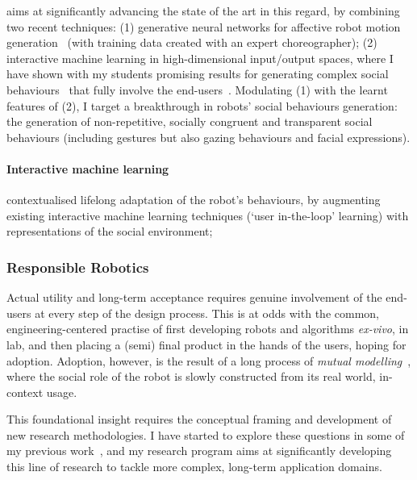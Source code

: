 \project aims at significantly advancing the state of the art in this regard, by
combining two recent techniques: (1) generative neural networks for affective
robot motion generation~\cite{marmpena2019generating,suguitan2020moveae} (with
training data created with an expert choreographer); (2) interactive machine
learning in high-dimensional input/output spaces, where I have shown with my
students promising results for generating complex social
behaviours~\cite{senft2019teaching, winkle2020couch} that fully involve the
end-users~\cite{winkle2018social}. Modulating (1) with the learnt features of
(2), I target a breakthrough in robots' social behaviours generation: the
generation of non-repetitive, socially congruent and transparent social
behaviours (including gestures but also gazing behaviours and facial
expressions).


\paragraph{Interactive machine learning}

contextualised lifelong adaptation of the robot's
behaviours, by augmenting existing interactive machine
learning techniques (`user in-the-loop' learning) with
representations of the social environment;


\subsubsection{Responsible Robotics}

Actual utility and long-term acceptance requires genuine involvement of the
end-users at every step of the design process. This is at odds with the common,
engineering-centered practise of first developing robots and algorithms \emph{ex-vivo}, in
lab, and then placing a (semi) final product in the hands of the users, hoping
for adoption. Adoption, however, is the result of a long process of \emph{mutual
modelling}~\autocite{sabanovic2010robots}, where
the social role of the robot is slowly constructed from its real world, in-context
usage.

This foundational insight requires the conceptual framing and development of new
research methodologies.  I have started to explore these questions in some of my
previous work~\autocite{senft2016sparc,winkle2019effective,winkle2021leador},
and my research program aims at significantly developing this line of research
to tackle more complex, long-term application domains.

